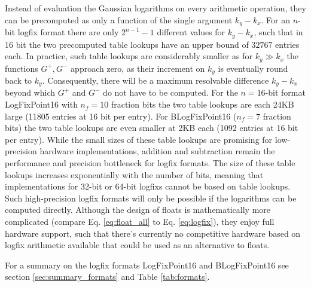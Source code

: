 Instead of evaluation the Gaussian logarithms on every arithmetic operation, they can be precomputed as only a function of the single argument
$k_y-k_x$. For an $n$-bit logfix format there are only $2^{n-1}-1$ different values for $k_y-k_x$, such that in 16 bit the two precomputed table
lookups have an upper bound of $32767$ entries each. In practice, such table lookups are considerably smaller as for $k_y \gg k_x$  the functions
$G^+,G^-$ approach zero, as their increment on $k_y$ is eventually round back to $k_y$. Consequently, there will be a maximum resolvable
difference $k_y-k_x$ beyond which $G^+$ and $G^-$ do not have to be computed. For the $n=16$-bit format LogFixPoint16 with $n_f=10$
fraction bits the two table lookups are each 24KB large (11805 entries at 16 bit per entry). For BLogFixPoint16 ($n_f=7$ fraction bits) the two
table lookups are even smaller at 2KB each (1092 entries at 16 bit per entry). While the small sizes of these table lookups are promising
for low-precision hardware implementations, addition and subtraction remain the performance and precision bottleneck for logfix
formats. The size of these table lookups increases exponentially with the number of bits, meaning that implementations
for 32-bit or 64-bit logfixs cannot be based on table lookups. Such high-precision logfix formats will only be possible
if the logarithms can be computed directly.  Although the design of floats is mathematically more complicated
(compare Eq. \ref{eq:float_all} to Eq. \ref{eq:logfix}), they enjoy full hardware support, such that there's currently no 
competitive hardware based on logfix arithmetic available that could be used as an alternative to floats.

For a summary on the logfix formats LogFixPoint16 and BLogFixPoint16 see section \ref{sec:summary_formats} and Table \ref{tab:formats}.

